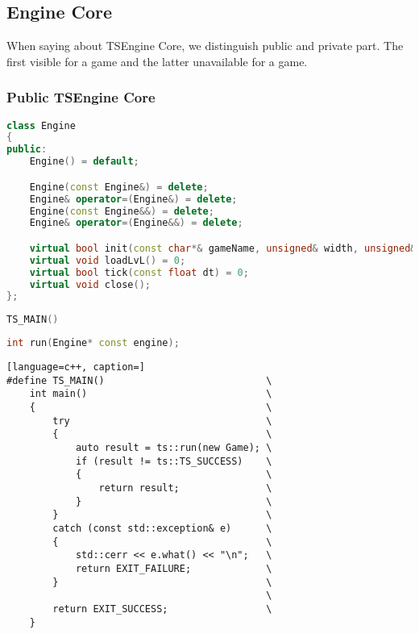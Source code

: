 \newpage
\subsection{Engine Core}
\label{sec:engine_core}
When saying about TSEngine Core, we distinguish public and private part. The first visible for a game and the latter unavailable for a game.
\subsubsection{Public TSEngine Core}
\label{sec:engine_class}
\begin{lstlisting}[language=c++, caption=Engine class (./engine/include/tsengine/core.h)]
class Engine
{
public:
    Engine() = default;

    Engine(const Engine&) = delete;
    Engine& operator=(Engine&) = delete;
    Engine(const Engine&&) = delete;
    Engine& operator=(Engine&&) = delete;

    virtual bool init(const char*& gameName, unsigned& width, unsigned& height);
    virtual void loadLvL() = 0;
    virtual bool tick(const float dt) = 0;
    virtual void close();
};
\end{lstlisting}

\begin{lstlisting}[language=c++, caption=Start of the Example Game (./game/game.cpp)]
TS_MAIN()
\end{lstlisting}

\label{sec:run_fun}
\begin{lstlisting}[language=c++, caption=Run function (./engine/include/tsengine/core.h)]
int run(Engine* const engine);
\end{lstlisting}

\begin{lstlisting}[language=c++, caption=]
#define TS_MAIN()                            \
    int main()                               \
    {                                        \
        try                                  \
        {                                    \
            auto result = ts::run(new Game); \
            if (result != ts::TS_SUCCESS)    \
            {                                \
                return result;               \
            }                                \
        }                                    \
        catch (const std::exception& e)      \
        {                                    \
            std::cerr << e.what() << "\n";   \
            return EXIT_FAILURE;             \
        }                                    \
                                             \
        return EXIT_SUCCESS;                 \
    }
\end{lstlisting}

